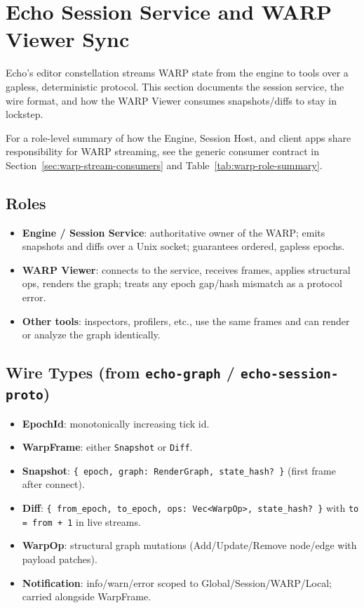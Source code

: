 \section{Echo Session Service and WARP Viewer Sync}
\label{sec:session-service}

Echo’s editor constellation streams WARP state from the engine to tools over a gapless, deterministic protocol. This section documents the session service, the wire format, and how the WARP Viewer consumes snapshots/diffs to stay in lockstep.

For a role-level summary of how the Engine, Session Host, and client apps
share responsibility for WARP streaming, see the generic consumer contract in
Section~\ref{sec:warp-stream-consumers} and
Table~\ref{tab:warp-role-summary}.

\subsection{Roles}
\begin{itemize}
  \item \textbf{Engine / Session Service}: authoritative owner of the WARP; emits snapshots and diffs over a Unix socket; guarantees ordered, gapless epochs.
  \item \textbf{WARP Viewer}: connects to the service, receives frames, applies structural ops, renders the graph; treats any epoch gap/hash mismatch as a protocol error.
  \item \textbf{Other tools}: inspectors, profilers, etc., use the same frames and can render or analyze the graph identically.
\end{itemize}

\subsection{Wire Types (from \texttt{echo-graph} / \texttt{echo-session-proto})}
\begin{itemize}
  \item \textbf{EpochId}: monotonically increasing tick id.
  \item \textbf{WarpFrame}: either \texttt{Snapshot} or \texttt{Diff}.
  \item \textbf{Snapshot}: \texttt{\{ epoch, graph: RenderGraph, state\_hash? \}} (first frame after connect).
  \item \textbf{Diff}: \texttt{\{ from\_epoch, to\_epoch, ops: Vec<WarpOp>, state\_hash? \}} with \texttt{to = from + 1} in live streams.
  \item \textbf{WarpOp}: structural graph mutations (Add/Update/Remove node/edge with payload patches).
  \item \textbf{Notification}: info/warn/error scoped to Global/Session/WARP/Local; carried alongside WarpFrame.
\end{itemize}

